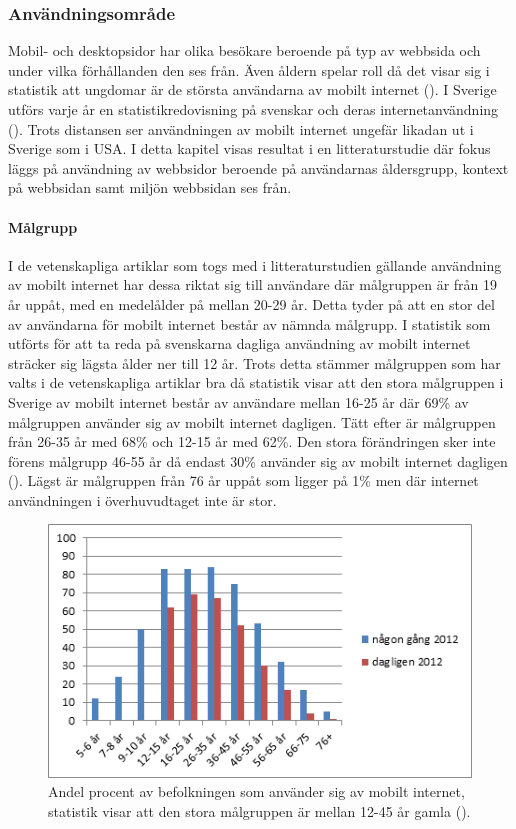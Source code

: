 \documentclass[11pt]{article}
\begin{document}
\subsubsection{Användningsområde}

Mobil- och desktopsidor har olika besökare beroende på typ av webbsida och under vilka förhållanden den ses från. Även åldern spelar roll då det visar sig i statistik att ungdomar är de största användarna av mobilt internet (\cite[s.24]{.se}). I Sverige utförs varje år en statistikredovisning på svenskar och deras internetanvändning (\cite{.se}). Trots distansen ser användningen av mobilt internet ungefär likadan ut i Sverige som i USA. I detta kapitel visas resultat i en litteraturstudie där fokus läggs på användning av webbsidor beroende på användarnas åldersgrupp, kontext på webbsidan samt miljön webbsidan ses från.

\paragraph{Målgrupp}\mbox{}

I de vetenskapliga artiklar som togs med i litteraturstudien gällande användning av mobilt internet har dessa riktat sig till användare där målgruppen är från 19 år uppåt, med en medelålder på mellan 20-29 år. Detta tyder på att en stor del av användarna för mobilt internet består av nämnda målgrupp. I statistik som utförts för att ta reda på svenskarna dagliga användning av mobilt internet sträcker sig lägsta ålder ner till 12 år. Trots detta stämmer målgruppen som har valts i de vetenskapliga artiklar bra då statistik visar att den stora målgruppen i Sverige av mobilt internet består av användare mellan 16-25 år där 69\% av målgruppen använder sig av mobilt internet dagligen. Tätt efter är målgruppen från 26-35 år med 68\% och 12-15 år med 62\%. Den stora förändringen sker inte förens målgrupp 46-55 år då endast 30\% använder sig av mobilt internet dagligen (\cite[s. 24]{.se}). Lägst är målgruppen från 76 år uppåt som ligger på 1\% men där internet användningen i överhuvudtaget inte är stor.
\\
\setcounter{figure}{4}
\begin{figure}[H]
  \centering
    \includegraphics[scale=0.8]{pics/statistikalder.png}
    \caption{Andel procent av befolkningen som använder sig av mobilt internet, statistik visar att den stora målgruppen är mellan 12-45 år gamla (\cite[s. 24]{.se}).}
\end{figure}
\end{document}
